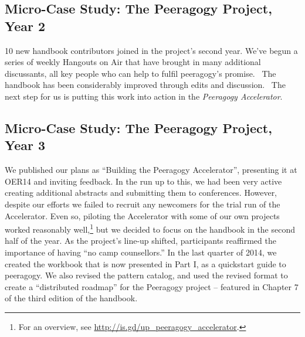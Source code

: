 \subsection{{\small {Micro-}Case Study: The Peeragogy Project, Year
2}}\label{micro-case-study-the-peeragogy-project-year-2}

10 new handbook contributors joined in the project's second year. We've
begun a series of weekly Hangouts on Air that have brought in many
additional discussants, all key people who can help to fulfil
peeragogy's promise.~ The handbook has been considerably improved
through edits and discussion.~ The next step for us is putting this work
into action in the \emph{Peeragogy Accelerator}.

\subsection{{\small {Micro-}Case Study: The Peeragogy Project, Year
3}}\label{micro-case-study-the-peeragogy-project-year-3}

We published our plans as ``Building the Peeragogy Accelerator'',
presenting it at OER14 and inviting feedback. In the run up to this, we
had been very active creating additional abstracts and submitting them
to conferences. However, despite our efforts we failed to recruit any
newcomers for the trial run of the Accelerator. Even so, piloting the
Accelerator with some of our own projects worked reasonably
well,\footnote{For an overview, see
  \url{http://is.gd/up_peeragogy_accelerator}.} but we decided to focus
on the handbook in the second half of the year. As the project's line-up
shifted, participants reaffirmed the importance of having ``no camp
counsellors.'' In the last quarter of 2014, we created the workbook that
is now presented in Part I, as a quickstart guide to peeragogy. We also
revised the pattern catalog, and used the revised format to create a
``distributed roadmap'' for the Peeragogy project -- featured in Chapter
7 of the third edition of the handbook.
